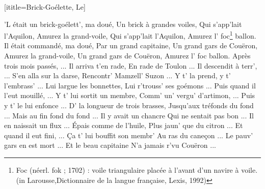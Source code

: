  [ititle={Brick-Goélette, Le}]

\beginverse
'L était un brick-goélett', ma doué,
Un brick à grandes voiles,
Qui s'app'lait l'Aquilon,
Amurez la grand-voile,
Qui s'app'lait l'Aquilon,
Amurez l' foc\footnote{Foc (néerl. fok ; 1702) : voile triangulaire placée à l'avant d'un navire à voile. (in Larousse,Dictionnaire de la langue française, Lexis, 1992)} ballon.
\endverse
\beginverse
Il était commandé, ma doué,
Par un grand capitaine,
Un grand gars de Couëron,
Amurez la grand-voile,
Un grand gars de Couëron,
Amurez l' foc ballon.
\endverse
\beginverse
Après trois mois passés, ...
Il arriva t'en rade,
En rade de Toulon ...
\endverse
\beginverse
Il descendit à terr', ...
S'en alla sur la darse,
Rencontr' Mamzell' Suzon ...
\endverse
\beginverse
Y t' la prend, y t' l'embrass' ...
Lui largue les bonnettes,
Lui r'trouss' ses goémons ...
\endverse
\beginverse
Puis quand il l'eut mouillé, ...
Y t' lui sortit un membre,
Comm' un' vergu' d'artimon, ...
\endverse
\beginverse
Puis y t' le lui enfonce ...
D' la longueur de trois brasses,
Jusqu'aux tréfonds du fond ...
\endverse
\beginverse
Mais au fin fond du fond ...
Il y avait un chancre
Qui ne sentait pas bon ...
\endverse
\beginverse
Il en naissait un flux ...
Épais comme de l'huile,
Plus jaun' que du citron ...
\endverse
\beginverse
Et quand il eut fini, ...
Ça t' lui bouffit son membr'
Au ras du caneçon ...
\endverse
\beginverse
Le pauv' gars en est mort ...
Et le beau capitaine
N'a jamais r'vu Couëron ...
\endverse
\endsong